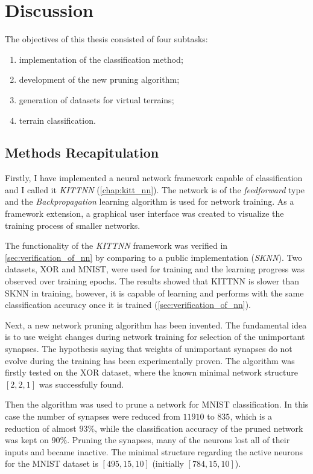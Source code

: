 \chapter{Discussion} \label{chap:discussion}
The objectives of this thesis consisted of four subtasks:

\begin{enumerate}
\item implementation of the classification method;
\item development of the new pruning algorithm;
\item generation of datasets for virtual terrains;
\item terrain classification.
\end{enumerate}

\section{Methods Recapitulation} \label{sec:dis:methods_recap}
Firstly, I have implemented a neural network framework capable of classification and I called it \textit{KITTNN} (\cref{chap:kitt_nn}). The network is of the \textit{feedforward} type and the \textit{Backpropagation} learning algorithm is used for network training. As a framework extension, a graphical user interface was created to visualize the training process of smaller networks.

The functionality of the \textit{KITTNN} framework was verified in \cref{sec:verification_of_nn} by comparing to a public implementation (\textit{SKNN}). Two datasets, XOR and MNIST, were used for training and the learning progress was observed over training epochs. The results showed that KITTNN is slower than SKNN in training, however, it is capable of learning and performs with the same classification accuracy once it is trained (\cref{sec:verification_of_nn}).

Next, a new network pruning algorithm has been invented. The fundamental idea is to use weight changes during network training for selection of the unimportant synapses. The hypothesis saying that weights of unimportant synapses do not evolve during the training has been experimentally proven. The algorithm was firstly tested on the XOR dataset, where the known minimal network structure $ [2, 2, 1] $ was successfully found.

Then the algorithm was used to prune a network for MNIST classification. In this case the number of synapses were reduced from $ 11910 $ to $ 835 $, which is a reduction of almost $ 93\% $, while the classification accuracy of the pruned network was kept on $ 90\% $. Pruning the synapses, many of the neurons lost all of their inputs and became inactive. The minimal structure regarding the active neurons for the MNIST dataset is $ [495, 15, 10] $ (initially $ [784, 15, 10] $). 

